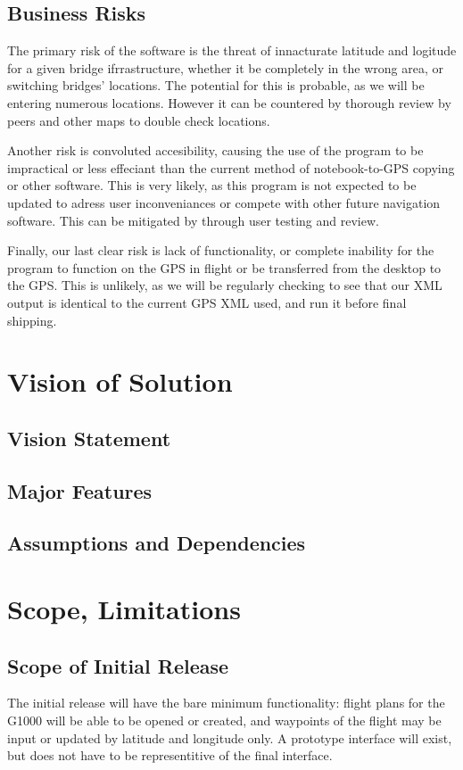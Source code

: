 \documentclass[12pt, letterpaper]{article}
\begin{document}
\subsection{Business Risks}
The primary risk of the software is the threat of innacturate latitude and logitude for a given bridge ifrrastructure, whether it be completely in the wrong area, or switching bridges' locations. The potential for this is probable, as we will be entering numerous locations. However it can be countered by thorough review by peers and other maps to double check locations.

Another risk is convoluted accesibility, causing the use of the program to be impractical or less effeciant than the current method of notebook-to-GPS copying or other software. This is very likely, as this program is not expected to be updated to adress user inconveniances or compete with other future navigation software. This can be mitigated by through user testing and review. 

Finally, our last clear risk is lack of functionality, or complete inability for the program to function on the GPS in flight or be transferred from the desktop to the GPS. This is unlikely, as we will be regularly checking to see that our XML output is identical to the current GPS XML used, and run it before final shipping. 

\section{Vision of Solution}
\subsection{Vision Statement}
\subsection{Major Features}
\subsection{Assumptions and Dependencies}

\section{Scope, Limitations}
\subsection{Scope of Initial Release}
The initial release will have the bare minimum functionality:
    flight plans for the G1000 will be able to be opened or created,
    and waypoints of the flight may be input or updated by latitude and longitude only.
A prototype interface will exist, but does not have to be representitive of the final interface.
\end{document}
